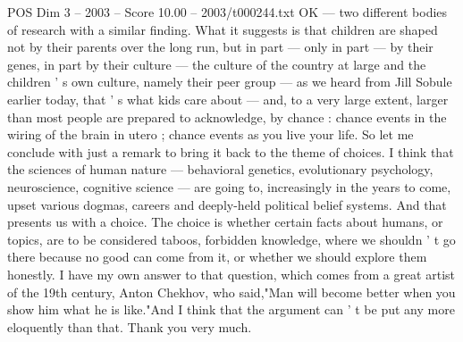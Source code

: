 \begin{textsample}{POS Dim 3 – 2003 – Score 10.00 – 2003/t000244.txt}
OK — two different bodies of research with a similar finding.
What it suggests is that children are shaped not by their parents over the long run, but in part — only in part — by their genes, in part by their culture — the culture of the country at large and the children ' s own culture, namely their peer group — as we heard from Jill Sobule earlier today, that ' s what kids care about — and, to a very large extent, larger than most people are prepared to acknowledge, by chance : chance events in the wiring of the brain in utero ; chance events as you live your life.
So let me conclude with just a remark to bring it back to the theme of choices.
I think that the sciences of human nature — behavioral genetics, evolutionary psychology, neuroscience, cognitive science — are going to, increasingly in the years to come, upset various dogmas, careers and deeply-held political belief systems.
And that presents us with a choice.
The choice is whether certain facts about humans, or topics, are to be considered taboos, forbidden knowledge, where we shouldn ' t go there because no good can come from it, or whether we should explore them honestly.
I have my own answer to that question, which comes from a great artist of the 19th century, Anton Chekhov, who said,"Man will become better when you show him what he is like."And I think that the argument can ' t be put any more eloquently than that.
Thank you very much.

\end{textsample}
